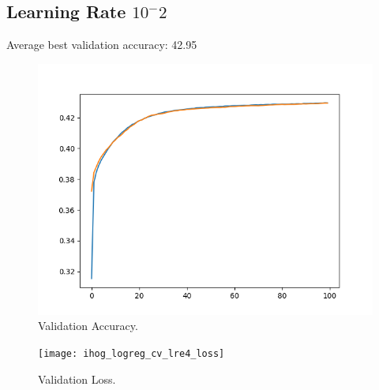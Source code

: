 \documentclass[12pt, letter]{article}
\begin{document}
\subsection{Learning Rate $10^-2$}
Average best validation accuracy: 42.95%
\begin{figure}[h]
  \centering
  \includegraphics[scale=0.60]{hog_logreg_cv_lre4_acc}
  \caption{Validation Accuracy.}
  \label{fig:eg}
\end{figure}
\begin{figure}[h]
  \centering
  \texttt{[image: ihog\_logreg\_cv\_lre4\_loss]}
  \caption{Validation Loss.}
  \label{fig:eg}
\end{figure}
\end{document}
